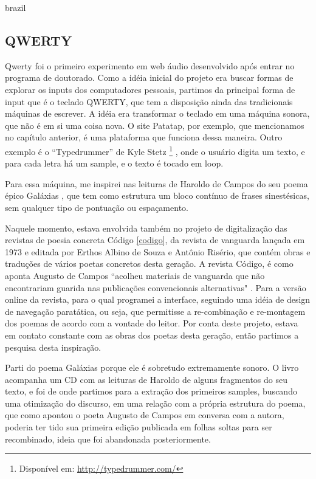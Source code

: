 \begin{otherlanguage*}{brazil}
\subsection{QWERTY}
\label{sec:QWERTY}
Qwerty foi o primeiro experimento em web áudio desenvolvido após entrar no programa de doutorado. Como a idéia inicial do projeto era buscar formas de explorar os inputs dos computadores pessoais, partimos da principal forma de input que é o teclado QWERTY, que tem a disposição ainda das tradicionais máquinas de escrever. A idéia era transformar o teclado em uma máquina sonora, que não é em si uma coisa nova. O site Patatap, por exemplo, que mencionamos no capítulo anterior, é uma plataforma que funciona dessa maneira. Outro exemplo é o ``Typedrummer'' de Kyle Stetz \footnote{Disponível em: \url{http://typedrummer.com/}} , onde o usuário digita um texto, e para cada letra há um sample, e o texto é tocado em loop.


Para essa máquina, me inspirei nas leituras de Haroldo de Campos do seu poema épico Galáxias \cite{Campos2004}, que tem como estrutura um bloco contínuo de frases sinestésicas, sem qualquer tipo de pontuação ou espaçamento. 

Naquele momento, estava envolvida também no projeto de digitalização das revistas de poesia concreta Código \ref{codigo}, da revista de vanguarda lançada em 1973 e editada por Erthos Albino de Souza e Antônio Risério, que contém obras e traduções de vários poetas concretos desta geração. A revista Código, é como aponta Augusto de Campos ``acolheu materiais de vanguarda que não encontrariam guarida nas publicações convencionais alternativas" \cite{Scandurra2016}. Para a versão online da revista, para o qual programei a interface, seguindo uma idéia de design de navegação paratática, ou seja, que permitisse a re-combinação e re-montagem dos poemas de acordo com a vontade do leitor. Por conta deste projeto, estava em contato constante com as obras dos poetas desta geração, então partimos a pesquisa desta inspiração.

Parti do poema Galáxias porque ele é sobretudo extremamente sonoro. O livro acompanha um CD com as leituras de Haroldo de alguns fragmentos do seu texto, e foi de onde partimos para a extração dos primeiros samples, buscando uma otimização do discurso, em uma relação com a própria estrutura do poema, que como apontou o poeta Augusto de Campos em conversa com a autora, poderia ter tido sua primeira edição publicada em folhas soltas para ser recombinado, ideia que foi abandonada posteriormente.


\end{otherlanguage*}
